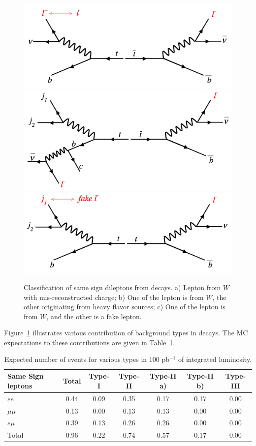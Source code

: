 \begin{figure}[htb]
\begin{center}
\includegraphics[width=0.32\linewidth, height=0.2\linewidth]{figs/feyntypeI.png}
\includegraphics[width=0.32\linewidth, height=0.2\linewidth]{figs/feyntypeIIa.png}
\includegraphics[width=0.32\linewidth, height=0.2\linewidth]{figs/feyntypeIIb.png}
\caption{ Classification of same sign dileptons from \ttbar decays. a) Lepton from $W$ with mis-reconstructed charge; 
b) One of the lepton is from $W$, the other originating from heavy flavor sources; c) One of the lepton is from $W$,
and the other is a fake lepton. \label{fig:fakeOrigin}}
\end{center}
\end{figure}

Figure~\ref{fig:fakeOrigin} illustrates various contribution of background types in \ttbar decays. The MC 
expectations to these contributions are given in Table~\ref{tab:fakeOrigin}.

\begin{table}[hbt]
\begin{center}
\begin{tabular}{|l|c|c|c|c|c|c|}\hline
Same Sign leptons & Total & 	 Type-I &  Type-II & Type-II a) & Type-II b) & Type-III \\ \hline
$ee$ &	0.44 &	0.09 &	0.35 &	0.17 &	0.17 &	0.00 \\
$\mu \mu$ & 	0.13 &	0.00 &	0.13 &	0.13 &	0.00 &	0.00 \\
$e\mu$ &	0.39 &	0.13 &	0.26 &	0.26 &	0.00 &	0.00 \\
Total &	0.96 &	0.22 &	0.74 &	0.57 &	0.17 &	0.00 \\
\hline
\end{tabular}
\caption{ Expected number of \ttbar events for various types in 100 pb$^{-1}$ of integrated luminosity.\label{tab:fakeOrigin}}
\end{center}
\end{table}

